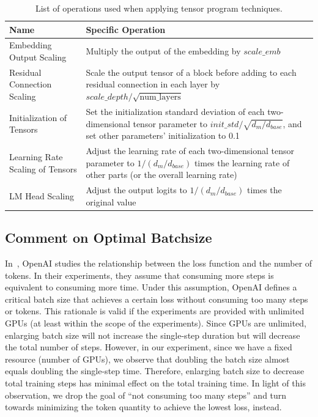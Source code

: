 \begin{table}[h]
\centering
\begin{tabular}{l|p{8cm}}
\toprule
\textbf{Name}                       & \textbf{Specific Operation}                                                                                                                 \\ \midrule
Embedding Output Scaling            & Multiply the output of the embedding by $scale\_{emb}$                                                                                                                                                     \\ \hline
Residual Connection Scaling         & Scale the output tensor of a block before adding to each residual connection in each layer by $scale\_{depth}/\sqrt{\text{num\_layers}}$ 
\\ \hline
Initialization of Tensors           & Set the initialization standard deviation of each two-dimensional tensor parameter to $init\_std/\sqrt{d_m/d_{base}}$, and set other parameters' initialization to 0.1                  \\ \hline
Learning Rate Scaling of Tensors    & Adjust the learning rate of each two-dimensional tensor parameter to $1/({d_m/d_{base}}) $ times the learning rate of other parts (or the overall learning rate)                    \\ \hline
LM Head Scaling                    & Adjust the output logits to $1/(d_m/d_{base})$ times the original value                                                                                                           \\ \bottomrule
\end{tabular}
\caption{List of operations used when applying tensor program techniques.}
\label{tab:mup}
\end{table}

\subsection{Comment on Optimal Batchsize}
\label{app:batchsize}
In~\cite{kaplan2020scaling}, OpenAI studies the relationship between the loss function and the number of tokens. In their experiments, they assume that consuming more steps is equivalent to consuming more time. Under this assumption, OpenAI defines a critical batch size that achieves a certain loss without consuming too many steps or tokens. This rationale is valid if the experiments are provided with unlimited GPUs (at least within the scope of the experiments). Since GPUs are unlimited, enlarging batch size will not increase the single-step duration but will decrease the total number of steps. However, in our experiment, since we have a fixed resource (number of GPUs), we observe that doubling the batch size almost equals doubling the single-step time. Therefore, enlarging batch size to decrease total training steps has minimal effect on the total training time. In light of this observation, we drop the goal of ``not consuming too many steps'' and turn towards minimizing the token quantity to achieve the lowest loss, instead.

